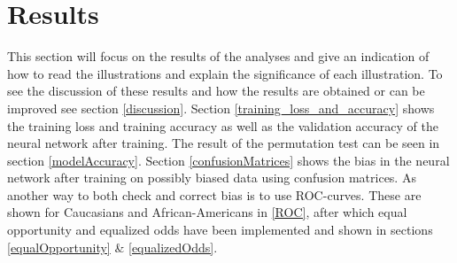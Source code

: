 \documentclass[11pt, fleqn, titlepage]{article}
\begin{document}

	
	\section{Results}\label{results}
	
	
	This section will focus on the results of the analyses and give an indication of how to read the illustrations and explain the significance of each illustration. To see the discussion of these results and how the results are obtained or can be improved see section \ref{discussion}. Section \ref{training_loss_and_accuracy} shows the training loss and training accuracy as well as the validation accuracy of the neural network after training. The result of the permutation test can be seen in section \ref{modelAccuracy}. Section \ref{confusionMatrices} shows the bias in the neural network after training on possibly biased data using confusion matrices. As another way to both check and correct bias is to use ROC-curves. These are shown for Caucasians and African-Americans in \ref{ROC}, after which equal opportunity and equalized odds have been implemented and shown in sections \ref{equalOpportunity} \& \ref{equalizedOdds}.
	
\end{document}
